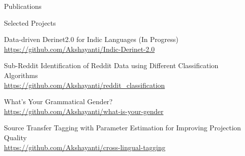 \documentclass{resume}
\begin{document}

\begin{rSection}{Publications}


    {}

    {}
    
    {}

    {}

\end{rSection}



\begin{rSection}{Selected Projects}

    {Data-driven Derinet2.0 for Indic Languages (In Progress)}\\
        \url{https://github.com/Akshayanti/Indic-Derinet-2.0}

    {Sub-Reddit Identification of Reddit Data using Different Classification Algorithms}\\
        \url{https://github.com/Akshayanti/reddit_classification}

    {What's Your Grammatical Gender?}\\
        \url{https://github.com/Akshayanti/what-is-your-gender}

    {Source Transfer Tagging with Parameter Estimation for Improving Projection Quality}\\
        \url{https://github.com/Akshayanti/cross-lingual-tagging}

\end{rSection}


\end{document}
